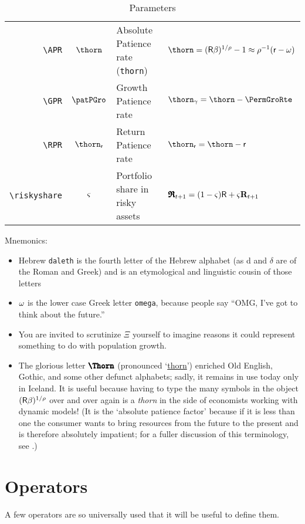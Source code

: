 \documentclass[12pt]{\econtex}
\begin{document}
\begin{table}[ht]
\begin{tabular}{|>{\ttfamily}rcll|}
    \\ \verb|\APR|  & $\pat$ & Absolute Patience rate (\texttt{thorn}) & $\pat = (\Rfree \DiscFac)^{1/\CRRA}-1 \approx \CRRA^{-1}(\rfree-\discRte) $
    \\ \verb|\GPR| & $\patPGro$ & Growth Patience rate  & $\patpGro = \pat -\PermGroRte $
    \\ \verb|\RPR| & $\patr$ & Return Patience rate  & $\patr =\pat -\rfree $
    \\ \verb|\riskyshare|  & $\varsigma$ & Portfolio share in risky assets & $\pmb{\mathfrak{R}}_{t+1}=(1-\varsigma)\mathsf{R}+\varsigma\mathbf{R}_{t+1}$
    \\	\hline
  \end{tabular}
  \caption{Parameters}
  \label{table:Parameters}
\end{table}	

Mnemonics:
\begin{itemize}
\item Hebrew \texttt{daleth} is the fourth letter of the Hebrew alphabet (as d and $\delta$ are of the Roman and Greek) and is an etymological and linguistic cousin of those letters
\item $\omega$ is the lower case Greek letter \texttt{omega}, because people say ``OMG, I've got to think about the future.''
\item You are invited to scrutinize $\Xi$ yourself to imagine reasons it could represent something to do with population growth.  
\item The glorious letter $\Pat$ (pronounced `\href{http://en.wikipedia.org/wiki/Thorn_(letter)}{thorn}') enriched Old English, Gothic, and some other defunct alphabets; sadly, it remains in use today only in Iceland.  It is useful because having to type the many symbols in the object $(\mathsf{R} \beta)^{1/\rho}$ over and over again is a \textit{thorn} in the side of economists working with dynamic models!  (It is the `absolute patience factor' because if it is less than one the consumer wants to bring resources from the future to the present and is therefore absolutely impatient; for a fuller discussion of this terminology, see \cite{carrollTractable}.)
\end{itemize}


\hypertarget{Operators}{}
\section{Operators}
A few operators are so universally used that it will be useful to define them.
\end{document}
